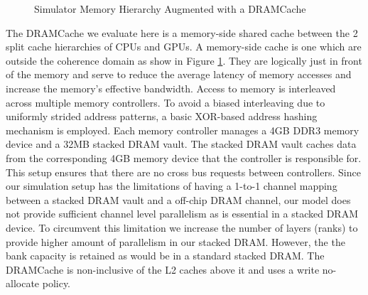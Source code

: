 \begin{figure}[!htb]
	\centering
	\def\svgwidth{\columnwidth}
	
	\caption{Simulator Memory Hierarchy Augmented with a DRAMCache}
	\label{fig:simulator-memory}
\end{figure}

\par The DRAMCache we evaluate here is a memory-side \cite{skylake} shared cache between the 2 split cache hierarchies of CPUs and GPUs. A memory-side cache is one which are outside the coherence domain as show in Figure \ref{fig:simulator-memory}. They are logically just in front of the memory and serve to reduce the average latency of memory accesses and increase the memory's effective bandwidth. Access to memory is interleaved across multiple memory controllers. To avoid a biased interleaving due to uniformly strided address patterns, a basic XOR-based address hashing mechanism is employed. Each memory controller manages a 4GB DDR3 memory device and a 32MB stacked DRAM vault. The stacked DRAM vault caches data from the corresponding 4GB memory device that the controller is responsible for. This setup ensures that there are no cross bus requests between controllers. Since our simulation setup has the limitations of having a 1-to-1 channel mapping between a stacked DRAM vault and a off-chip DRAM channel, our model does not provide sufficient channel level parallelism as is essential in a stacked DRAM device. To circumvent this limitation we increase the number of layers (ranks) to provide higher amount of parallelism in our stacked DRAM. However, the the bank capacity is retained as would be in a standard stacked DRAM. The DRAMCache is non-inclusive  \cite{coherence-dramcache} of the L2 caches above it and uses a write no-allocate policy. 

